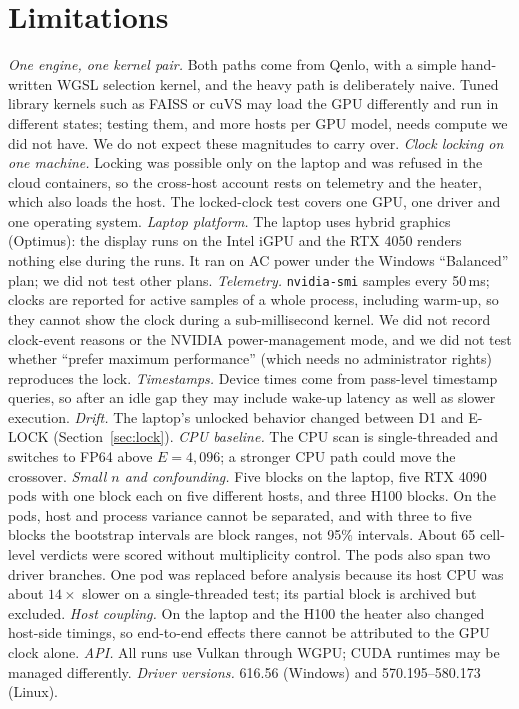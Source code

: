 \documentclass[10pt,twocolumn]{article}
\begin{document}
\section{Limitations}\label{sec:limitations}
\emph{One engine, one kernel pair.} Both paths come from Qenlo, with a simple hand-written WGSL selection kernel, and the heavy path is deliberately naive. Tuned library kernels such as FAISS or cuVS may load the GPU differently and run in different states; testing them, and more hosts per GPU model, needs compute we did not have. We do not expect these magnitudes to carry over. \emph{Clock locking on one machine.} Locking was possible only on the laptop and was refused in the cloud containers, so the cross-host account rests on telemetry and the heater, which also loads the host. The locked-clock test covers one GPU, one driver and one operating system. \emph{Laptop platform.} The laptop uses hybrid graphics (Optimus): the display runs on the Intel iGPU and the RTX 4050 renders nothing else during the runs. It ran on AC power under the Windows ``Balanced'' plan; we did not test other plans. \emph{Telemetry.} \texttt{nvidia-smi} samples every 50\,ms; clocks are reported for active samples of a whole process, including warm-up, so they cannot show the clock during a sub-millisecond kernel. We did not record clock-event reasons or the NVIDIA power-management mode, and we did not test whether ``prefer maximum performance'' (which needs no administrator rights) reproduces the lock. \emph{Timestamps.} Device times come from pass-level timestamp queries, so after an idle gap they may include wake-up latency as well as slower execution. \emph{Drift.} The laptop's unlocked behavior changed between D1 and E-LOCK (Section~\ref{sec:lock}). \emph{CPU baseline.} The CPU scan is single-threaded and switches to FP64 above $E=4{,}096$; a stronger CPU path could move the crossover. \emph{Small $n$ and confounding.} Five blocks on the laptop, five RTX 4090 pods with one block each on five different hosts, and three H100 blocks. On the pods, host and process variance cannot be separated, and with three to five blocks the bootstrap intervals are block ranges, not 95\% intervals. About 65 cell-level verdicts were scored without multiplicity control. The pods also span two driver branches. One pod was replaced before analysis because its host CPU was about $14\times$ slower on a single-threaded test; its partial block is archived but excluded. \emph{Host coupling.} On the laptop and the H100 the heater also changed host-side timings, so end-to-end effects there cannot be attributed to the GPU clock alone. \emph{API.} All runs use Vulkan through WGPU; CUDA runtimes may be managed differently. \emph{Driver versions.} 616.56 (Windows) and 570.195--580.173 (Linux).
\end{document}
